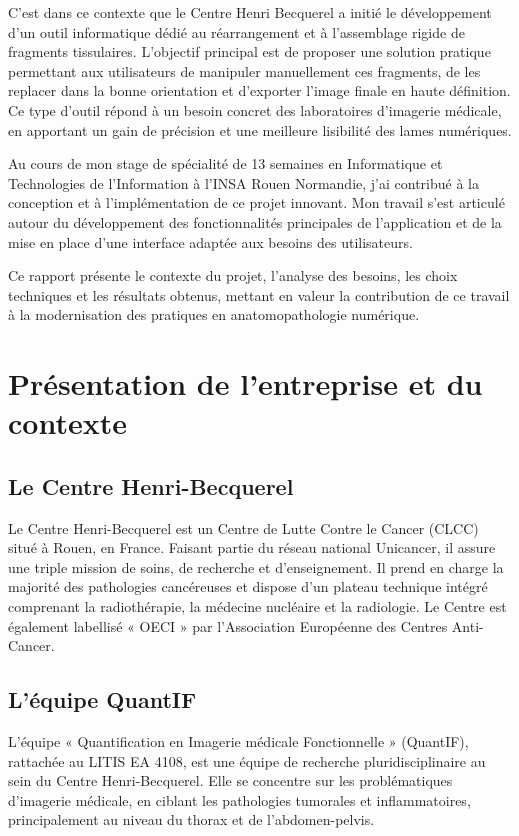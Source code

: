 \documentclass[12pt,a4paper]{report}
\begin{document}
C'est dans ce contexte que le Centre Henri Becquerel a initié le développement d'un outil informatique dédié au réarrangement et à l'assemblage rigide de fragments tissulaires. L'objectif principal est de proposer une solution pratique permettant aux utilisateurs de manipuler manuellement ces fragments, de les replacer dans la bonne orientation et d'exporter l'image finale en haute définition. Ce type d'outil répond à un besoin concret des laboratoires d'imagerie médicale, en apportant un gain de précision et une meilleure lisibilité des lames numériques.

Au cours de mon stage de spécialité de 13 semaines en Informatique et Technologies de l'Information à l'INSA Rouen Normandie, j'ai contribué à la conception et à l'implémentation de ce projet innovant. Mon travail s'est articulé autour du développement des fonctionnalités principales de l'application et de la mise en place d'une interface adaptée aux besoins des utilisateurs.

Ce rapport présente le contexte du projet, l'analyse des besoins, les choix techniques et les résultats obtenus, mettant en valeur la contribution de ce travail à la modernisation des pratiques en anatomopathologie numérique.

\chapter{Présentation de l'entreprise et du contexte}

\section{Le Centre Henri-Becquerel}

Le Centre Henri-Becquerel est un Centre de Lutte Contre le Cancer (CLCC) situé à Rouen, en France. Faisant partie du réseau national Unicancer, il assure une triple mission de soins, de recherche et d'enseignement. Il prend en charge la majorité des pathologies cancéreuses et dispose d'un plateau technique intégré comprenant la radiothérapie, la médecine nucléaire et la radiologie. Le Centre est également labellisé « OECI » par l'Association Européenne des Centres Anti-Cancer.

\section{L'équipe QuantIF}

L'équipe « Quantification en Imagerie médicale Fonctionnelle » (QuantIF), rattachée au LITIS EA 4108, est une équipe de recherche pluridisciplinaire au sein du Centre Henri-Becquerel. Elle se concentre sur les problématiques d'imagerie médicale, en ciblant les pathologies tumorales et inflammatoires, principalement au niveau du thorax et de l'abdomen-pelvis.
\end{document}
